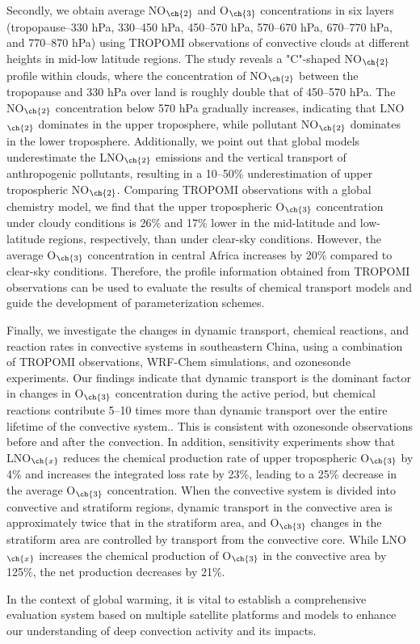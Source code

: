 {Secondly, we obtain average NO$_{\ch{2}}$ and O$_{\ch{3}}$ concentrations in six layers (tropopause--330 hPa, 330--450 hPa, 450--570 hPa, 570--670 hPa, 670--770 hPa, and 770--870 hPa) using TROPOMI observations of convective clouds at different heights in mid-low latitude regions.
The study reveals a "C"-shaped NO$_{\ch{2}}$ profile within clouds, where the concentration of NO$_{\ch{2}}$ between the tropopause and 330 hPa over land is roughly double that of 450--570 hPa.
The NO$_{\ch{2}}$ concentration below 570 hPa gradually increases, indicating that LNO$_{\ch{2}}$ dominates in the upper troposphere, while pollutant NO$_{\ch{2}}$ dominates in the lower troposphere.
Additionally, we point out that global models underestimate the LNO$_{\ch{2}}$ emissions and the vertical transport of anthropogenic pollutants, resulting in a 10--50\% underestimation of upper tropospheric NO$_{\ch{2}}$.
Comparing TROPOMI observations with a global chemistry model, we find that the upper tropospheric O$_{\ch{3}}$ concentration under cloudy conditions is 26\% and 17\% lower in the mid-latitude and low-latitude regions, respectively, than under clear-sky conditions.
However, the average O$_{\ch{3}}$ concentration in central Africa increases by 20\% compared to clear-sky conditions.
Therefore, the profile information obtained from TROPOMI observations can be used to evaluate the results of chemical transport models and guide the development of parameterization schemes.

Finally, we investigate the changes in dynamic transport, chemical reactions, and reaction rates in convective systems in southeastern China, using a combination of TROPOMI observations, WRF-Chem simulations, and ozonesonde experiments.
Our findings indicate that dynamic transport is the dominant factor in changes in O$_{\ch{3}}$ concentration during the active period,
but chemical reactions contribute 5--10 times more than dynamic transport over the entire lifetime of the convective system..
This is consistent with ozonesonde observations before and after the convection.
In addition, sensitivity experiments show that LNO$_{\ch{x}}$ reduces the chemical production rate of upper tropospheric O$_{\ch{3}}$ by 4\% and increases the integrated loss rate by 23\%,
leading to a 25\% decrease in the average O$_{\ch{3}}$ concentration.
When the convective system is divided into convective and stratiform regions,
dynamic transport in the convective area is approximately twice that in the stratiform area,
and O$_{\ch{3}}$ changes in the stratiform area are controlled by transport from the convective core.
While LNO$_{\ch{x}}$ increases the chemical production of O$_{\ch{3}}$ in the convective area by 125\%, the net production decreases by 21\%.

In the context of global warming, it is vital to establish a comprehensive evaluation system based on multiple satellite platforms and models to enhance our understanding of deep convection activity and its impacts.
}
